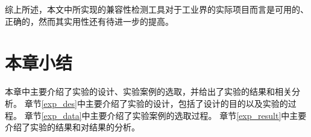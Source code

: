 综上所述，本文中所实现的兼容性检测工具对于工业界的实际项目而言是可用的、正确的，然而其实用性还有待进一步的提高。

\section{本章小结}
本章中主要介绍了实验的设计、实验案例的选取，并给出了实验的结果和相关分析。
章节\ref {exp_des}中主要介绍了实验的设计，包括了设计的目的以及实验的过程。
章节\ref {exp_data}中主要介绍了实验案例的选取过程。
章节\ref {exp_result}中主要介绍了实验的结果和对结果的分析。